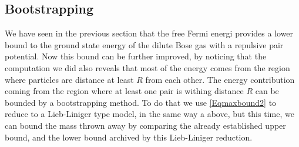 \documentclass[a4paper,11pt]{article}
\numberwithin{equation}{section}
\begin{document}
	\subsection{Bootstrapping}
	We have seen in the previous section that the free Fermi energi provides a lower bound to the ground state energy of the dilute Bose gas with a repulsive pair potential. Now this bound can be further improved, by noticing that the computation we did also reveals that most of the energy comes from the region where particles are distance at least $ R $ from each other. The energy contribution coming from the region where at least one pair is withing distance $ R $ can be bounded by a bootstrapping method. To do that we use \eqref{Eqmaxbound2} to reduce to a Lieb-Liniger type model, in the same way a above, but this time, we can bound the mass thrown away by comparing the already established upper bound, and the lower bound archived by this Lieb-Liniger reduction. 
	
\end{document}
